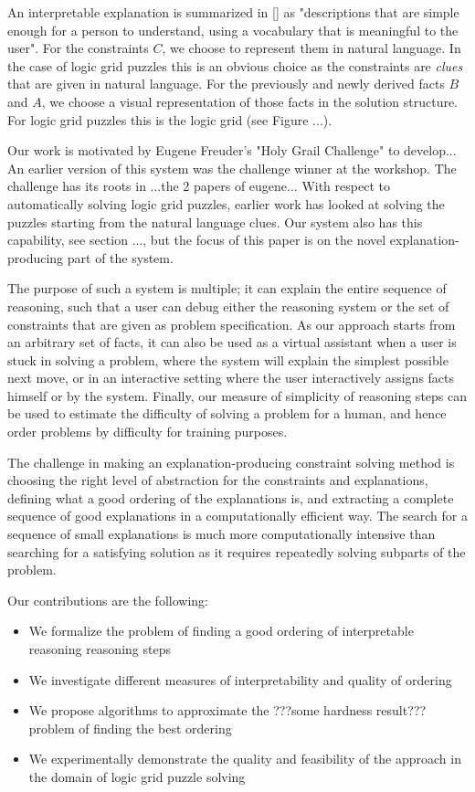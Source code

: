An interpretable explanation is summarized in [] as "descriptions that are simple enough for a person to understand, using a vocabulary that is meaningful to the user". For the constraints $C$, we choose to represent them in natural language. In the case of logic grid puzzles this is an obvious choice as the constraints are \textit{clues} that are given in natural language. For the previously and newly derived facts $B$ and $A$, we choose a visual representation of those facts in the solution structure. For logic grid puzzles this is the logic grid (see Figure ...).

Our work is motivated by Eugene Freuder's "Holy Grail Challenge" to develop... An earlier version of this system was the challenge winner at the workshop. The challenge has its roots in ...the 2 papers of eugene... With respect to automatically solving logic grid puzzles, earlier work has looked at solving the puzzles starting from the natural language clues. Our system also has this capability, see section ..., but the focus of this paper is on the novel explanation-producing part of the system.

The purpose of such a system is multiple; it can explain the entire sequence of reasoning, such that a user can debug either the reasoning system or the set of constraints that are given as problem specification. As our approach starts from an arbitrary set of facts, it can also be used as a virtual assistant when a user is stuck in solving a problem, where the system will explain the simplest possible next move, or in an interactive setting where the user interactively assigns facts himself or by the system. Finally, our measure of simplicity of reasoning steps can be used to estimate the difficulty of solving a problem for a human, and hence order problems by difficulty for training purposes.

The challenge in making an explanation-producing constraint solving method is choosing the right level of abstraction for the constraints and explanations, defining what a good ordering of the explanations is, and extracting a complete sequence of good explanations in a computationally efficient way. The search for a sequence of small explanations is much more computationally intensive than searching for a satisfying solution as it requires repeatedly solving subparts of the problem.

Our contributions are the following:
\begin{itemize}
	\item We formalize the problem of finding a good ordering of interpretable reasoning reasoning steps
	\item We investigate different measures of interpretability and quality of ordering
	\item We propose algorithms to approximate the ???some hardness result??? problem of finding the best ordering
	\item We experimentally demonstrate the quality and feasibility of the approach in the domain of logic grid puzzle solving
\end{itemize}


